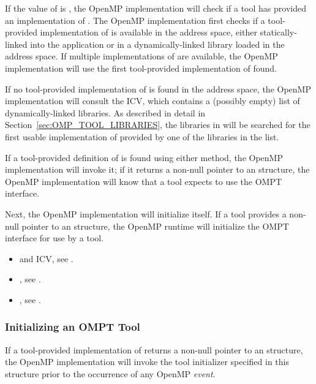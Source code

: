 If the value of  is , the OpenMP
implementation will check if a tool has provided an
implementation of .  The OpenMP implementation first
checks if a tool-provided implementation of  is
available in the address space, either statically-linked into the
application or in a dynamically-linked library loaded in the address
space. If multiple implementations of  are available,
the OpenMP implementation will use the first tool-provided
implementation of  found.

If no tool-provided implementation of  is found in
the address space, the OpenMP implementation will consult the
 ICV, which contains a (possibly empty) list
of dynamically-linked libraries.  As described in detail in
Section~\ref{sec:OMP_TOOL_LIBRARIES}, the libraries in
 will be searched for the first usable
implementation of  provided by one of the libraries
in the list.

If a tool-provided definition of  is found using
either method, the OpenMP implementation will invoke it; if it returns
a non-null pointer to an  structure,
the OpenMP implementation will know
that a tool expects to use the OMPT interface.

Next, the OpenMP implementation will initialize itself. If a tool
provides a non-null pointer to an  structure,
the OpenMP runtime will initialize the OMPT interface for use by a tool.

\crossreferences
\begin{itemize}
\item {} and  ICV, see .
\item {}, see .
\item {}, see .
\end{itemize}

\subsubsection{Initializing an OMPT Tool}
\label{sec:tool-initialize}

If a tool-provided implementation of  returns a
non-null pointer to an  structure,
the OpenMP implementation will invoke the tool initializer specified
in this structure prior to the occurrence of any OpenMP \emph{event}.

